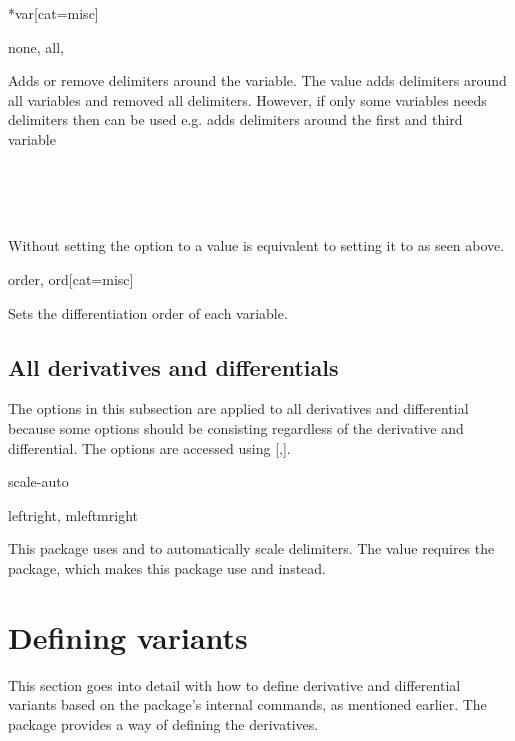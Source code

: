 	\begin{option}*{var}[cat=misc]
		\begin{values}[default=none]
			none, all, 
		\end{values}
		Adds or remove delimiters around the variable. The value  adds delimiters around all variables and  removed all delimiters. However, if only some variables needs delimiters then  can be used e.g.  adds delimiters around the first and third variable
		\begin{example}
			 \\
			 \\
			 \\
		\end{example}
		Without setting the option to a value is equivalent to setting it to  as seen above.
	\end{option}
	
	\begin{option}{order, ord}[cat=misc]
		\begin{values}[default = 1]
		\end{values}
		Sets the differentiation order of each variable.
	\end{option}
	
	\subsection{All derivatives and differentials} \label{ssec:both_options}
	The options in this subsection are applied to all derivatives and differential because some options should be consisting regardless of the derivative and differential. The options are accessed using \macro{\derivset}[,].
	
	\begin{option}{scale-auto}
		\begin{values}[default = leftright]
			leftright, mleftmright\req
		\end{values}
		This package uses  and  to automatically scale delimiters. The value  requires the  package, which makes this package use  and  instead.
	\end{option}
	
	
	
	\clearpage
	\section{Defining variants} \label{sec:defvar}
	This section goes into detail with how to define derivative and differential variants based on the package's internal commands, as mentioned earlier. The \mypackage{} package provides a  way of defining the derivatives.
	
